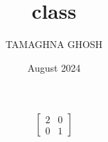 \documentclass{article}
\title{class}
\author{TAMAGHNA GHOSH}
\date{August 2024}
\begin{document}
\maketitle

\[
\begin{bmatrix}
2 & 0 \\
0 & 1
\end{bmatrix}
\]
\end{document}
